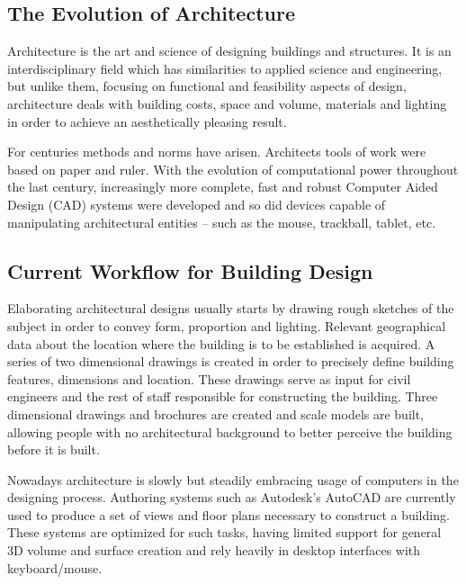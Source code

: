 

\subsection{The Evolution of Architecture}
Architecture is the art and science of designing buildings and structures.
It is an interdisciplinary field which has similarities to applied science and
engineering, but unlike them, focusing on functional and feasibility aspects of design, 
architecture deals with building costs, space and volume, materials and lighting
in order to achieve an aesthetically pleasing result.

For centuries methods and norms have arisen. Architects tools of work were based on paper and ruler.
With the evolution of computational power throughout the last century, 
increasingly more complete, fast and robust Computer Aided Design (CAD) systems were developed and so did
devices capable of manipulating architectural entities -- such as the mouse, trackball, tablet, etc.

\subsection{Current Workflow for Building Design}
Elaborating architectural designs usually starts by drawing rough sketches of the subject
in order to convey form, proportion and lighting.
Relevant geographical data about the location where the building is to be established is acquired.
A series of two dimensional drawings is created in order to precisely define building features, dimensions and location.
These drawings serve as input for civil engineers and the rest of staff responsible for constructing the building.
Three dimensional drawings and brochures are created and scale models are built,
allowing people with no architectural background to better perceive the building before it is built.

Nowadays architecture is slowly but steadily embracing usage of computers in the designing process.
Authoring systems such as Autodesk's AutoCAD
\cite{SITE-AUTOCAD}
are currently used to produce a set of views and floor plans necessary to construct a building.
These systems are optimized for such tasks, having limited support for general 3D volume and surface creation
and rely heavily in desktop interfaces with keyboard/mouse.


